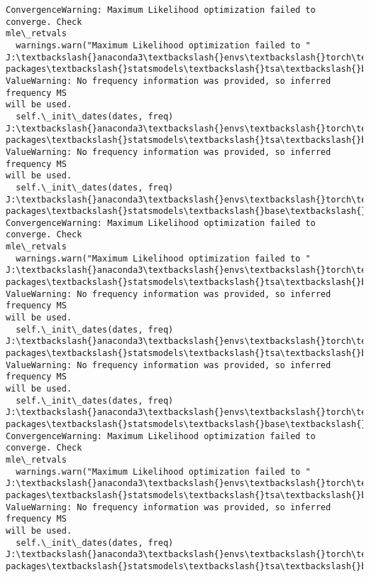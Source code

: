\documentclass[11pt]{article}
\begin{document}
\begin{Verbatim}[commandchars=\\\{\}]
ConvergenceWarning: Maximum Likelihood optimization failed to converge. Check
mle\_retvals
  warnings.warn("Maximum Likelihood optimization failed to "
J:\textbackslash{}anaconda3\textbackslash{}envs\textbackslash{}torch\textbackslash{}Lib\textbackslash{}site-packages\textbackslash{}statsmodels\textbackslash{}tsa\textbackslash{}base\textbackslash{}tsa\_model.py:473:
ValueWarning: No frequency information was provided, so inferred frequency MS
will be used.
  self.\_init\_dates(dates, freq)
J:\textbackslash{}anaconda3\textbackslash{}envs\textbackslash{}torch\textbackslash{}Lib\textbackslash{}site-packages\textbackslash{}statsmodels\textbackslash{}tsa\textbackslash{}base\textbackslash{}tsa\_model.py:473:
ValueWarning: No frequency information was provided, so inferred frequency MS
will be used.
  self.\_init\_dates(dates, freq)
J:\textbackslash{}anaconda3\textbackslash{}envs\textbackslash{}torch\textbackslash{}Lib\textbackslash{}site-packages\textbackslash{}statsmodels\textbackslash{}base\textbackslash{}model.py:607:
ConvergenceWarning: Maximum Likelihood optimization failed to converge. Check
mle\_retvals
  warnings.warn("Maximum Likelihood optimization failed to "
J:\textbackslash{}anaconda3\textbackslash{}envs\textbackslash{}torch\textbackslash{}Lib\textbackslash{}site-packages\textbackslash{}statsmodels\textbackslash{}tsa\textbackslash{}base\textbackslash{}tsa\_model.py:473:
ValueWarning: No frequency information was provided, so inferred frequency MS
will be used.
  self.\_init\_dates(dates, freq)
J:\textbackslash{}anaconda3\textbackslash{}envs\textbackslash{}torch\textbackslash{}Lib\textbackslash{}site-packages\textbackslash{}statsmodels\textbackslash{}tsa\textbackslash{}base\textbackslash{}tsa\_model.py:473:
ValueWarning: No frequency information was provided, so inferred frequency MS
will be used.
  self.\_init\_dates(dates, freq)
J:\textbackslash{}anaconda3\textbackslash{}envs\textbackslash{}torch\textbackslash{}Lib\textbackslash{}site-packages\textbackslash{}statsmodels\textbackslash{}base\textbackslash{}model.py:607:
ConvergenceWarning: Maximum Likelihood optimization failed to converge. Check
mle\_retvals
  warnings.warn("Maximum Likelihood optimization failed to "
J:\textbackslash{}anaconda3\textbackslash{}envs\textbackslash{}torch\textbackslash{}Lib\textbackslash{}site-packages\textbackslash{}statsmodels\textbackslash{}tsa\textbackslash{}base\textbackslash{}tsa\_model.py:473:
ValueWarning: No frequency information was provided, so inferred frequency MS
will be used.
  self.\_init\_dates(dates, freq)
J:\textbackslash{}anaconda3\textbackslash{}envs\textbackslash{}torch\textbackslash{}Lib\textbackslash{}site-packages\textbackslash{}statsmodels\textbackslash{}tsa\textbackslash{}base\textbackslash{}tsa\_model.py:473:

\end{Verbatim}
\end{document}
